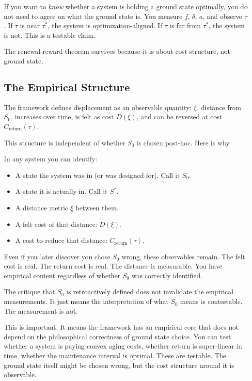 \documentclass[12pt]{article}
\begin{document}
If you want to \textit{know} whether a system is holding a ground state optimally, you do not need to agree on what the ground state is. You measure $f$, $\delta$, $a$, and observe $\tau$. If $\tau$ is near $\tau^*$, the system is optimization-aligned. If $\tau$ is far from $\tau^*$, the system is not. This is a testable claim.

The renewal-reward theorem survives because it is about cost structure, not ground state.

\subsection{The Empirical Structure}

The framework defines displacement as an observable quantity: $\xi$, distance from $S_0$, increases over time, is felt as cost $D(\xi)$, and can be reversed at cost $C_{\text{return}}(\tau)$.

This structure is independent of whether $S_0$ is chosen post-hoc. Here is why.

In any system you can identify:
\begin{itemize}
\item A state the system was in (or was designed for). Call it $S_0$.
\item A state it is actually in. Call it $S^*$.
\item A distance metric $\xi$ between them.
\item A felt cost of that distance: $D(\xi)$.
\item A cost to reduce that distance: $C_{\text{return}}(\tau)$.
\end{itemize}

Even if you later discover you chose $S_0$ wrong, these observables remain. The felt cost is real. The return cost is real. The distance is measurable. You have empirical content regardless of whether $S_0$ was correctly identified.

The critique that $S_0$ is retroactively defined does not invalidate the empirical measurements. It just means the interpretation of what $S_0$ means is contestable. The measurement is not.

This is important. It means the framework has an empirical core that does not depend on the philosophical correctness of ground state choice. You can test whether a system is paying convex aging costs, whether return is super-linear in time, whether the maintenance interval is optimal. These are testable. The ground state itself might be chosen wrong, but the cost structure around it is observable.
\end{document}
